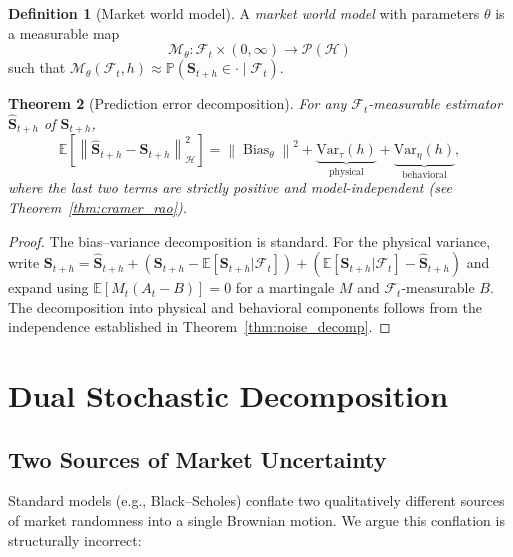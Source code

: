 \documentclass[12pt,a4paper]{article}
\theoremstyle{plain}
\newtheorem{theorem}{Theorem}[section]
\theoremstyle{definition}
\newtheorem{definition}[theorem]{Definition}
\newcommand{\E}{\mathbb{E}}
\newcommand{\PP}{\mathbb{P}}
\newcommand{\F}{\mathcal{F}}
\newcommand{\Hil}{\mathcal{H}}
\newcommand{\Prob}{\mathcal{P}}
\newcommand{\Var}{\mathrm{Var}}
\newcommand{\1}{\mathbbm{1}}
\newcommand{\norm}[1]{\left\|#1\right\|}
\DeclareMathOperator{\Bias}{Bias}
\begin{document}
\begin{definition}[Market world model]
\label{def:world_model}
A \emph{market world model} with parameters $\theta$ is a measurable map
\[
\mathcal{M}_\theta : \F_t \times (0,\infty) \to \Prob(\Hil)
\]
such that $\mathcal{M}_\theta(\F_t, h) \approx \PP(\mathbf{S}_{t+h} \in \cdot \mid \F_t)$.
\end{definition}

\begin{theorem}[Prediction error decomposition]
\label{thm:pred_decomp}
For any $\F_t$-measurable estimator $\hat{\mathbf{S}}_{t+h}$ of $\mathbf{S}_{t+h}$,
\begin{equation}
\label{eq:pred_decomp}
\E\!\left[\norm{\hat{\mathbf{S}}_{t+h} - \mathbf{S}_{t+h}}_\Hil^2\right]
= \norm{\Bias_\theta}^2
  + \underbrace{\Var_\tau(h)}_{\text{physical}}
  + \underbrace{\Var_\eta(h)}_{\text{behavioral}},
\end{equation}
where the last two terms are strictly positive and model-independent
(see Theorem~\ref{thm:cramer_rao}).
\end{theorem}

\begin{proof}
The bias--variance decomposition is standard. For the physical variance, write
$\mathbf{S}_{t+h} = \hat{\mathbf{S}}_{t+h} + (\mathbf{S}_{t+h} - \E[\mathbf{S}_{t+h}|\F_t])
+ (\E[\mathbf{S}_{t+h}|\F_t] - \hat{\mathbf{S}}_{t+h})$ and expand using
$\E[M_t(A_t - B)] = 0$ for a martingale $M$ and $\F_t$-measurable $B$.
The decomposition into physical and behavioral components follows from the
independence established in Theorem~\ref{thm:noise_decomp}.
\end{proof}

\section{Dual Stochastic Decomposition}
\label{sec:noise}

\subsection{Two Sources of Market Uncertainty}

Standard models (e.g., Black--Scholes) conflate two qualitatively different
sources of market randomness into a single Brownian motion.
We argue this conflation is structurally incorrect:
\end{document}
